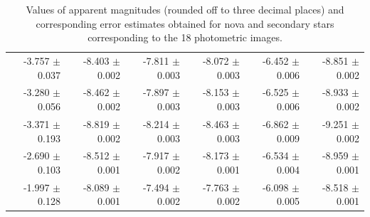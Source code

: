 \documentclass{tda}
\begin{document}
\begin{table}
\begin{tabular} {r r r r r r}
			-3.757 \(\pm\) 0.037 & -8.403 \(\pm\) 0.002 & -7.811 \(\pm\) 0.003 & -8.072 \(\pm\) 0.003 & -6.452 \(\pm\) 0.006 & -8.851 \(\pm\) 0.002 \\
			-3.280 \(\pm\) 0.056 & -8.462 \(\pm\) 0.002 & -7.897 \(\pm\) 0.003 & -8.153 \(\pm\) 0.003 & -6.525 \(\pm\) 0.006 & -8.933 \(\pm\) 0.002 \\
			-3.371 \(\pm\) 0.193 & -8.819 \(\pm\) 0.002 & -8.214 \(\pm\) 0.003 & -8.463 \(\pm\) 0.003 & -6.862 \(\pm\) 0.009 & -9.251 \(\pm\) 0.002 \\
			-2.690 \(\pm\) 0.103 & -8.512 \(\pm\) 0.001 & -7.917 \(\pm\) 0.002 & -8.173 \(\pm\) 0.001 & -6.534 \(\pm\) 0.004 & -8.959 \(\pm\) 0.001 \\
			-1.997 \(\pm\) 0.128 & -8.089 \(\pm\) 0.001 & -7.494 \(\pm\) 0.002 & -7.763 \(\pm\) 0.002 & -6.098 \(\pm\) 0.005 & -8.518 \(\pm\) 0.001 \\
			\bottomrule
		\end{tabular}
		\caption{Values of apparent magnitudes (rounded off to three decimal places) and corresponding error estimates obtained for nova and secondary stars corresponding to the 18 photometric images.}
		\label{table:photometry_nova_stars}
	\end{table}
\end{document}

